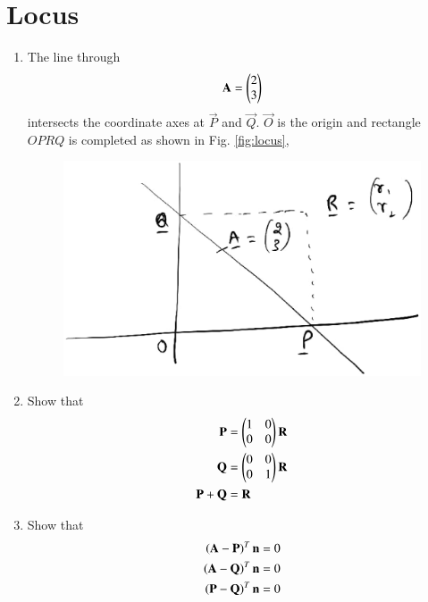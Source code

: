 \documentclass[journal,12pt,twocolumn]{IEEEtran}
\renewcommand\thesection{\arabic{section}}
\begin{document}
\section{Locus}
\begin{enumerate}[label=\thesection.\arabic*
,ref=\thesection.\theenumi]
\item The line through
\begin{equation}
\label{eq:locus}
\mathbf{A}=\begin{pmatrix}2\\3\end{pmatrix}
\end{equation}
intersects the coordinate axes at $\vec{P}$ and $\vec{Q}$.  $\vec{O}$ is the origin and rectangle $OPRQ$ is 
completed as shown in Fig. \eqref{fig:locus},
\begin{figure}
\centering
\includegraphics[width=\columnwidth]{./figs/locus.eps}
\caption{}
\label{fig:locus}
\end{figure}
\item Show that
\begin{align}
\mathbf{P}&= \begin{pmatrix}1 & 0\\ 0 & 0\end{pmatrix}\mathbf{R}
\label{eq:locusp}
\\
\mathbf{Q}&= \begin{pmatrix}0 & 0\\ 0 & 1\end{pmatrix}\mathbf{R}
\label{eq:locusq}
\\
\mathbf{P}+\mathbf{Q} &=\mathbf{R}
\label{eq:locusr}
\end{align}
\item Show that
\begin{align}
\begin{split}
\left(\mathbf{A}-\mathbf{P}\right)^T\mathbf{n} &= 0
\\
\left(\mathbf{A}-\mathbf{Q}\right)^T\mathbf{n} &= 0
\\
\left(\mathbf{P}-\mathbf{Q}\right)^T\mathbf{n} &= 0
\end{split}
\label{eq:locus_apq}
\end{align}

\end{enumerate}
\end{document}
